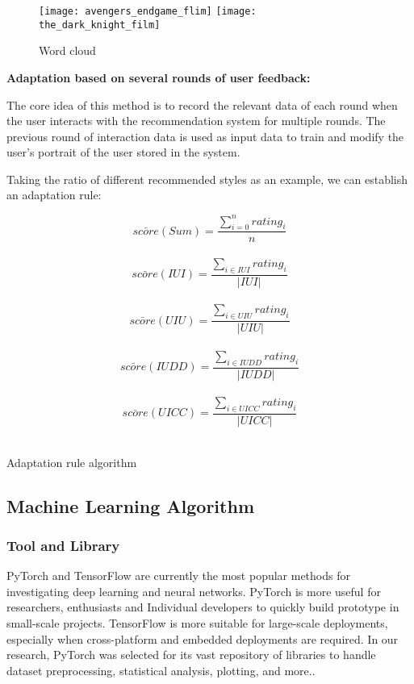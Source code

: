 \begin{figure}[h]
\caption{Word cloud}
\centering
\texttt{[image: avengers\_endgame\_flim]}
\texttt{[image: the\_dark\_knight\_film]}
\end{figure}
\textbf{Adaptation based on several rounds of user feedback:} \\
\par The core idea of this method is to record the relevant data of each round when the user interacts with the recommendation system for multiple rounds. The previous round of interaction data is used as input data to train and modify the user's portrait of the user stored in the system.
\par Taking the ratio of different recommended styles as an example, we can establish an adaptation rule:

\begin{algorithm}[H]
\SetAlgoLined
{}
  \[ \bar{score}(Sum) = \frac{\sum_{i=0}^{n}rating_{i}}{n} \] \
  \[ \bar{score}(IUI) = \frac{\sum_{i\in IUI}rating_{i}}{|IUI|} \] \
  \[ \bar{score}(UIU) = \frac{\sum_{i\in UIU}rating_{i}}{|UIU|} \] \
  \[ \bar{score}(IUDD) = \frac{\sum_{i\in IUDD}rating_{i}}{|IUDD|} \] \
  \[ \bar{score}(UICC) = \frac{\sum_{i\in UICC}rating_{i}}{|UICC|} \] \
 \While{\[ count_{sum}==10 \]}{
  \[ count_{IUI}  \mathrel{+}= func_{propotion}(\bar{score}(IUI)-\bar{score}(sum)) \] \
  \[ count_{UIU}  \mathrel{+}= func_{propotion}(\bar{score}(UIU)-\bar{score}(sum)) \] \
  \[ count_{IUDD}  \mathrel{+}= func_{propotion}(\bar{score}(IUDD)-\bar{score}(sum)) \] \
  \[ count_{UICC}  \mathrel{+}= func_{propotion}(\bar{score}(UICC)-\bar{score}(sum)) \] \
  \If{\[ count_{x} < 0 \]}{
    \[ count_{x} = 0 \] \
   }
 }
 \caption{Adaptation rule algorithm}
\end{algorithm}

\subsection{Machine Learning Algorithm}

\subsubsection{Tool and Library}
PyTorch\cite{ketkar2017introduction} and TensorFlow\cite{abadi2016tensorflow} are currently the most popular methods for investigating deep learning and neural networks. PyTorch is more useful for researchers, enthusiasts and Individual developers to quickly build prototype in small-scale projects. TensorFlow is more suitable for large-scale deployments, especially when cross-platform and embedded deployments are required. In our research, PyTorch was selected for its vast repository of libraries to handle dataset preprocessing, statistical analysis, plotting, and more.\cite{paszke2019pytorch}.

